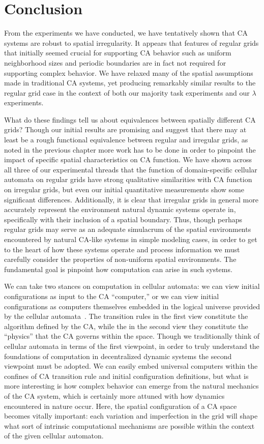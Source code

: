 \documentclass[a4paper,11pt,twoside]{report}
\begin{document}
\chapter{Conclusion}
\label{ch:conclusion}
From the experiments we have conducted, we have tentatively shown that CA systems are robust to spatial irregularity. It appears that features of regular grids that initially seemed crucial for supporting CA behavior such as uniform neighborhood sizes and periodic boundaries are in fact not required for supporting complex behavior. We have relaxed many of the spatial assumptions made in traditional CA systems, yet producing remarkably similar results to the regular grid case in the context of both our majority task experiments and our $\lambda$ experiments.

What do these findings tell us about equivalences between spatially different CA grids? Though our initial results are promising and suggest that there may at least be a rough functional equivalence between regular and irregular grids, as noted in the previous chapter more work has to be done in order to pinpoint the impact of specific spatial characteristics on CA function. We have shown across all three of our experimental threads that the function of domain-specific cellular automata on regular grids have strong qualitative similarities with CA function on irregular grids, but even our initial quantitative measurements show some significant differences. Additionally, it is clear that irregular grids in general more accurately represent the environment natural dynamic systems operate in, specifically with their inclusion of a spatial boundary. Thus, though perhaps regular grids may serve as an adequate simulacrum of the spatial environments encountered by natural CA-like systems in simple modeling cases, in order to get to the heart of how these systems operate and process information we must carefully consider the properties of non-uniform spatial environments. The fundamental goal is pinpoint how computation can arise in such systems. 

We can take two stances on computation in cellular automata: we can view initial configurations as input to the CA ``computer,'' or we can view initial configurations as computers themselves embedded in the logical universe provided by the cellular automata~\cite{la90}. The transition rules in the first view constitute the algorithm defined by the CA, while the in the second view they constitute the ``physics'' that the CA governs within the space. Though we traditionally think of cellular automata in terms of the first viewpoint, in order to truly understand the foundations of computation in decentralized dynamic systems the second viewpoint must be adopted. We can easily embed universal computers within the confines of CA transition rule and initial configuration definitions, but what is more interesting is how complex behavior can emerge from the natural mechanics of the CA system, which is certainly more attuned with how dynamics encountered in nature occur. Here, the spatial configuration of a CA space becomes vitally important: each variation and imperfection in the grid will shape what sort of intrinsic computational mechanisms are possible within the context of the given cellular automaton.
\end{document}
